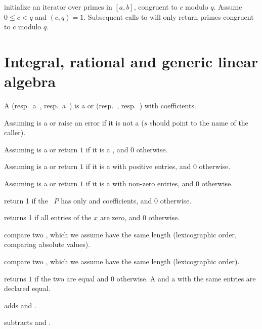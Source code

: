  initialize an iterator over primes in $[a,b]$, congruent to $c$
modulo $q$. Assume $0 \leq c < q$ and $(c,q) = 1$. Subsequent calls to
 will only return primes congruent to $c$ modulo $q$.

\section{Integral, rational and generic linear algebra}
 A  (resp.~a~,
resp.~a~) is a  or  (resp.~,
resp.~) with  coefficients.


 Assuming  is a 
or  raise an error if it is not a  ($s$ should point to the
name of the caller).

 Assuming  is a 
or  return $1$ if it is a , and $0$ otherwise.

 Assuming  is a 
or  return $1$ if it is a  with positive entries, and $0$
otherwise.

 Assuming  is a 
or  return $1$ if it is a  with non-zero entries, and $0$
otherwise.

 return 1 if the ~$P$ has only
 and  coefficients, and 0 otherwise.

 returns 1 if all entries of the  $x$ are
zero, and $0$ otherwise.

 compare two , which we assume have
the same length (lexicographic order, comparing absolute values).

 compare two , which we assume have
the same length (lexicographic order).

 returns $1$ if the two  are equal
and $0$ otherwise. A  and a  with the same entries are
declared equal.

 adds  and .

 subtracts  and .

